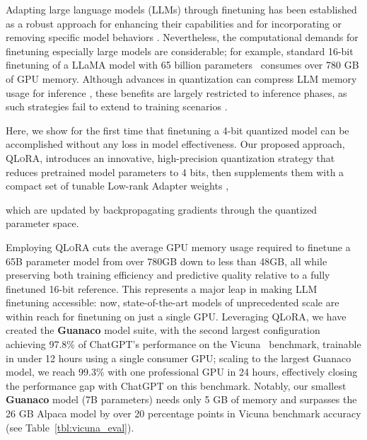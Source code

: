Adapting large language models (LLMs) through finetuning has been established as a robust approach for enhancing their capabilities \citep{min2021metaicl, wei2021finetuned, ouyang2022training, wang2022super, wang2022self, liu2022few} and for incorporating or removing specific model behaviors \citep{ouyang2022training,askell2021general,bai2022training}. Nevertheless, the computational demands for finetuning especially large models are considerable; for example, standard 16-bit finetuning of a LLaMA model with 65 billion parameters~\citep{touvron2023llama} consumes over 780 GB of GPU memory. Although advances in quantization can compress LLM memory usage for inference \citep{dettmers2022llm, dettmers2022case, frantar2022gptq, xiao2022smoothquant}, these benefits are largely restricted to inference phases, as such strategies fail to extend to training scenarios \citep{wortsman2023stable}.

Here, we show for the first time that finetuning a 4-bit quantized model can be accomplished without any loss in model effectiveness. Our proposed approach, \textsc{QLoRA}, introduces an innovative, high-precision quantization strategy that reduces pretrained model parameters to 4 bits, then supplements them with a compact set of tunable Low-rank Adapter weights \citep{hu2021lora}, 

which are updated by backpropagating gradients through the quantized parameter space.

Employing \textsc{QLoRA} cuts the average GPU memory usage required to finetune a 65B parameter model from over 780GB down to less than 48GB, all while preserving both training efficiency and predictive quality relative to a fully finetuned 16-bit reference. This represents a major leap in making LLM finetuning accessible: now, state-of-the-art models of unprecedented scale are within reach for finetuning on just a single GPU. Leveraging \textsc{QLoRA}, we have created the \textbf{Guanaco} model suite, with the second largest configuration achieving 97.8\% of ChatGPT’s performance on the Vicuna~\citep{vicuna2023} benchmark, trainable in under 12 hours using a single consumer GPU; scaling to the largest Guanaco model, we reach 99.3\% with one professional GPU in 24 hours, effectively closing the performance gap with ChatGPT on this benchmark. Notably, our smallest \textbf{Guanaco} model (7B parameters) needs only 5 GB of memory and surpasses the 26 GB Alpaca model by over 20 percentage points in Vicuna benchmark accuracy (see Table~\ref{tbl:vicuna_eval}).

